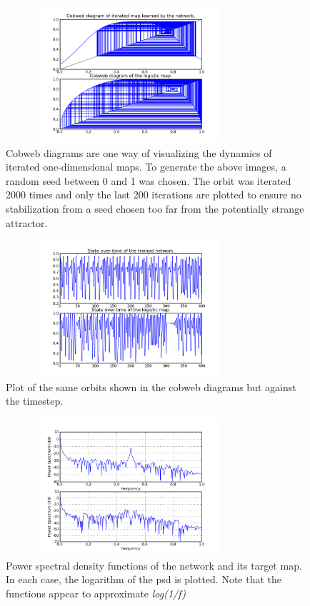 \documentclass[12pt]{article}
\begin{document}
\begin{figure}[htb]
\begin{center}
\includegraphics[height=2.0in,width=3.59in]{images/cobweb_1.png}
\caption{Cobweb diagrams are one way of visualizing the dynamics of iterated one-dimensional maps.  To generate the above images, a random seed between 0 and 1 was chosen.  The orbit was iterated 2000 times and only the last 200 iterations are plotted to ensure no stabilization from a seed chosen too far from the potentially strange attractor.}
\end{center}
\end{figure}
\begin{figure}[htb]
\begin{center}
\includegraphics[height=2.0in,width=3.59in]{images/orbit_1.png}
\caption{Plot of the same orbits shown in the cobweb diagrams but against the timestep.}
\end{center}
\end{figure}
\clearpage
\begin{figure}[htb]
\begin{center}
\includegraphics[height=2.0in,width=3.59in]{images/psd_1.png}
\caption{Power spectral density functions of the network and its target map.  In each case, the logarithm of the psd is plotted.  Note that the functions appear to approximate \textit{log(1/f)}}
\end{center}
\end{figure}
\end{document}
